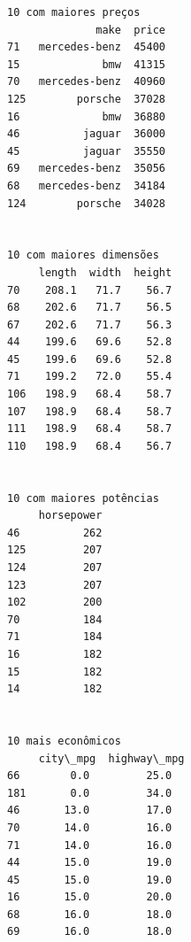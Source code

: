 \documentclass[11pt]{article}
\begin{document}
    \begin{Verbatim}[commandchars=\\\{\}]
10 com maiores preços
              make  price
71   mercedes-benz  45400
15             bmw  41315
70   mercedes-benz  40960
125        porsche  37028
16             bmw  36880
46          jaguar  36000
45          jaguar  35550
69   mercedes-benz  35056
68   mercedes-benz  34184
124        porsche  34028


10 com maiores dimensões
     length  width  height
70    208.1   71.7    56.7
68    202.6   71.7    56.5
67    202.6   71.7    56.3
44    199.6   69.6    52.8
45    199.6   69.6    52.8
71    199.2   72.0    55.4
106   198.9   68.4    58.7
107   198.9   68.4    58.7
111   198.9   68.4    58.7
110   198.9   68.4    56.7


10 com maiores potências
     horsepower
46          262
125         207
124         207
123         207
102         200
70          184
71          184
16          182
15          182
14          182


10 mais econômicos
     city\_mpg  highway\_mpg
66        0.0         25.0
181       0.0         34.0
46       13.0         17.0
70       14.0         16.0
71       14.0         16.0
44       15.0         19.0
45       15.0         19.0
16       15.0         20.0
68       16.0         18.0
69       16.0         18.0

    \end{Verbatim}
\end{document}
